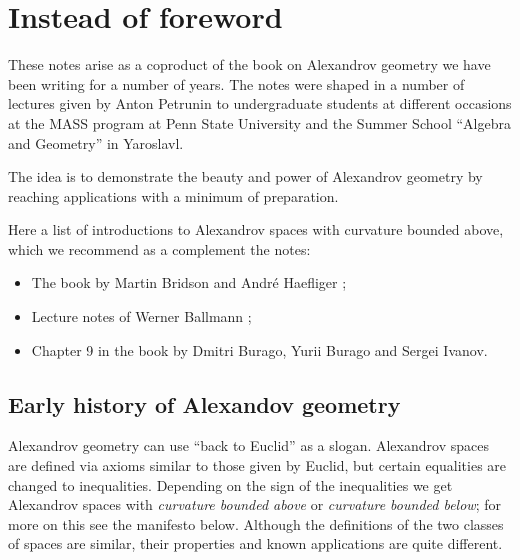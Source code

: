\mainmatter

\chapter*{Instead of foreword}

These notes arise as a coproduct of the book on Alexandrov geometry
we have been writing for  a number of years.
The notes were shaped in a number of lectures given by Anton Petrunin 
to undergraduate students 
at different  occasions at the
MASS program at Penn State University
and the Summer School ``Algebra and Geometry'' in Yaroslavl.

The idea is to demonstrate the beauty and power of Alexandrov geometry by reaching applications with a minimum of preparation.

\medskip

Here a list of introductions to Alexandrov spaces with curvature bounded above, which we recommend as a complement the notes: 
\begin{itemize}
\item The book by Martin Bridson and Andr\'e Haefliger \cite{BH};
\item Lecture notes of Werner Ballmann \cite{ballmann:lectures};
\item Chapter 9 in the book \cite{BBI} by Dmitri Burago, Yurii Burago and Sergei Ivanov.
\end{itemize}

\section*{Early history of Alexandov geometry}

Alexandrov geometry can use ``back to Euclid'' as a slogan.
Alexandrov spaces are defined via axioms similar to those given by Euclid,
but certain  equalities are changed to inequalities. 
Depending on the sign of the inequalities we get Alexandrov spaces with \emph{curvature bounded above} or \emph{curvature bounded below};
for more on this see the manifesto below.
Although the definitions of the two classes of spaces are similar, their properties and known applications are quite different.

